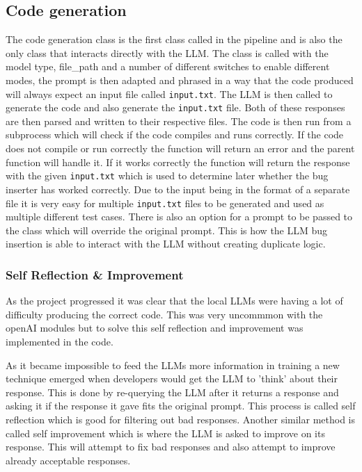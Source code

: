 \documentclass[12pt]{extarticle}
\begin{document}
\subsection{Code generation}

The code generation class is the first class called in the pipeline and is also the only class that interacts directly with the LLM. The class is called with the model type, file\_path and a number of different switches to enable different modes, the prompt is then adapted and phrased in a way that the code produced will always expect an input file called \texttt{input.txt}. The LLM is then called to generate the code and also generate the \texttt{input.txt} file. Both of these responses are then parsed and written to their respective files. The code is then run from a subprocess which will check if the code compiles and runs correctly. If the code does not compile or run correctly the function will return an error and the parent function will handle it. If it works correctly the function will return the response with the given \texttt{input.txt} which is used to determine later whether the bug inserter has worked correctly. Due to the input being in the format of a separate file it is very easy for multiple \texttt{input.txt} files to be generated and used as multiple different test cases. 
There is also an option for a prompt to be passed to the class which will override the original prompt. This is how the LLM bug insertion is able to interact with the LLM without creating duplicate logic. 

\subsubsection{Self Reflection \& Improvement}

As the project progressed it was clear that the local LLMs were having a lot of difficulty producing the correct code. This was very uncommmon with the openAI modules but to solve this self reflection and improvement was implemented in the code. 

As it became impossible to feed the LLMs more information in training a new technique emerged when developers would get the LLM to 'think' about their response. This is done by re-querying the LLM after it returns a response and asking it if the response it gave fits the original prompt. This process is called self reflection which is good for filtering out bad responses. Another similar method is called self improvement which is where the LLM is asked to improve on its response. This will attempt to fix bad responses and also attempt to improve already acceptable responses.
\end{document}
